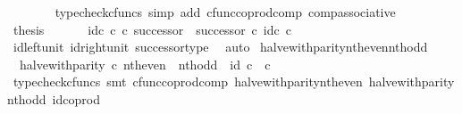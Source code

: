 \begin{isabellebody}
\ \ \ \ \ \ \isamarkupfalse%
\ {\isacharparenleft}{\kern0pt}typecheck{\isacharunderscore}{\kern0pt}cfuncs{\isacharcomma}{\kern0pt}\ simp\ add{\isacharcolon}{\kern0pt}\ cfunc{\isacharunderscore}{\kern0pt}coprod{\isacharunderscore}{\kern0pt}comp\ comp{\isacharunderscore}{\kern0pt}associative{}{\isacharparenright}{\kern0pt}\isanewline
\ \ \ \ \isamarkupfalse%
\ \isamarkupfalse%
\ {\isacharquery}{\kern0pt}thesis\isacommand{{\isachardot}{\kern0pt}}\isamarkupfalse%
\isanewline
\ \ \isamarkupfalse%
\isanewline
\ \ \isamarkupfalse%
\ {\isachardoublequoteopen}id\isactrlsub c\ {\isasymnat}\isactrlsub c\ {\isasymcirc}\isactrlsub c\ successor\ {\isacharequal}{\kern0pt}\ successor\ {\isasymcirc}\isactrlsub c\ id\isactrlsub c\ {\isasymnat}\isactrlsub c{\isachardoublequoteclose}\isanewline
\ \ \ \ \isamarkupfalse%
\ id{\isacharunderscore}{\kern0pt}left{\isacharunderscore}{\kern0pt}unit{}\ id{\isacharunderscore}{\kern0pt}right{\isacharunderscore}{\kern0pt}unit{}\ successor{\isacharunderscore}{\kern0pt}type\ \isamarkupfalse%
\ auto\isanewline
{}\isamarkupfalse%
%
\endisatagproof
{\isafoldproof}%
%
\isadelimproof
\isanewline
%
\endisadelimproof
\isanewline
{}\isamarkupfalse%
\ halve{\isacharunderscore}{\kern0pt}with{\isacharunderscore}{\kern0pt}parity{\isacharunderscore}{\kern0pt}nth{\isacharunderscore}{\kern0pt}even{\isacharunderscore}{\kern0pt}nth{\isacharunderscore}{\kern0pt}odd{\isacharcolon}{\kern0pt}\isanewline
\ \ {\isachardoublequoteopen}halve{\isacharunderscore}{\kern0pt}with{\isacharunderscore}{\kern0pt}parity\ {\isasymcirc}\isactrlsub c\ {\isacharparenleft}{\kern0pt}nth{\isacharunderscore}{\kern0pt}even\ {\isasymamalg}\ nth{\isacharunderscore}{\kern0pt}odd{\isacharparenright}{\kern0pt}\ {\isacharequal}{\kern0pt}\ id\ {\isacharparenleft}{\kern0pt}{\isasymnat}\isactrlsub c\ {\isasymCoprod}\ {\isasymnat}\isactrlsub c{\isacharparenright}{\kern0pt}{\isachardoublequoteclose}\isanewline
%
\isadelimproof
\ \ %
\endisadelimproof
%
\isatagproof
{}\isamarkupfalse%
\ {\isacharparenleft}{\kern0pt}typecheck{\isacharunderscore}{\kern0pt}cfuncs{\isacharcomma}{\kern0pt}\ smt\ cfunc{\isacharunderscore}{\kern0pt}coprod{\isacharunderscore}{\kern0pt}comp\ halve{\isacharunderscore}{\kern0pt}with{\isacharunderscore}{\kern0pt}parity{\isacharunderscore}{\kern0pt}nth{\isacharunderscore}{\kern0pt}even\ halve{\isacharunderscore}{\kern0pt}with{\isacharunderscore}{\kern0pt}parity{\isacharunderscore}{\kern0pt}nth{\isacharunderscore}{\kern0pt}odd\ id{\isacharunderscore}{\kern0pt}coprod{\isacharparenright}{\kern0pt}%

\end{isabellebody}

